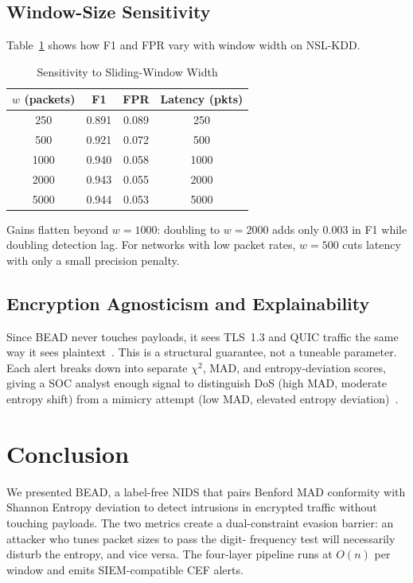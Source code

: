 \documentclass[conference]{IEEEtran}
\begin{document}
\subsection{Window-Size Sensitivity}

Table~\ref{tab:window} shows how F1 and FPR vary with window width on
NSL-KDD.

\begin{table}[h]
\caption{Sensitivity to Sliding-Window Width}
\label{tab:window}
\centering
\setlength{\tabcolsep}{5pt}
\begin{tabular}{@{}cccc@{}}
\toprule
$w$ (packets) & \textbf{F1} & \textbf{FPR} & \textbf{Latency (pkts)} \\
\midrule
250  & 0.891 & 0.089 & 250  \\
500  & 0.921 & 0.072 & 500  \\
1000 & 0.940 & 0.058 & 1000 \\
2000 & 0.943 & 0.055 & 2000 \\
5000 & 0.944 & 0.053 & 5000 \\
\bottomrule
\end{tabular}
\end{table}

Gains flatten beyond $w=1000$: doubling to $w=2000$ adds only 0.003 in
F1 while doubling detection lag. For networks with low packet rates,
$w=500$ cuts latency with only a small precision penalty.

\subsection{Encryption Agnosticism and Explainability}

Since BEAD never touches payloads, it sees TLS~1.3 and QUIC traffic
the same way it sees plaintext~\cite{b10}. This is a structural
guarantee, not a tuneable parameter. Each alert breaks down into
separate $\chi^2$, MAD, and entropy-deviation scores, giving a SOC
analyst enough signal to distinguish DoS (high MAD, moderate entropy
shift) from a mimicry attempt (low MAD, elevated entropy
deviation)~\cite{b18}.

\section{Conclusion}

We presented BEAD, a label-free NIDS that pairs Benford MAD conformity
with Shannon Entropy deviation to detect intrusions in encrypted traffic
without touching payloads. The two metrics create a dual-constraint
evasion barrier: an attacker who tunes packet sizes to pass the digit-
frequency test will necessarily disturb the entropy, and vice versa.
The four-layer pipeline runs at $O(n)$ per window and emits
SIEM-compatible CEF alerts.
\end{document}
